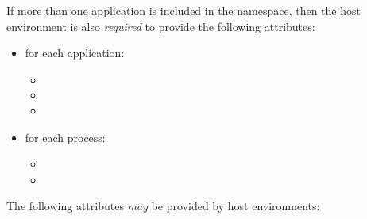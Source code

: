If more than one application is included in the namespace, then the host environment is also \textit{required} to provide the following attributes:

\begin{itemize}
    \item for each application:
        \begin{itemize}
            \item {}
            \item {}
            \item {}
        \end{itemize}
    \item for each process:
        \begin{itemize}
            \item {}
            \item {}
        \end{itemize}
\end{itemize}

\reqattrend


\optattrstart

The following attributes \textit{may} be provided by host environments:

